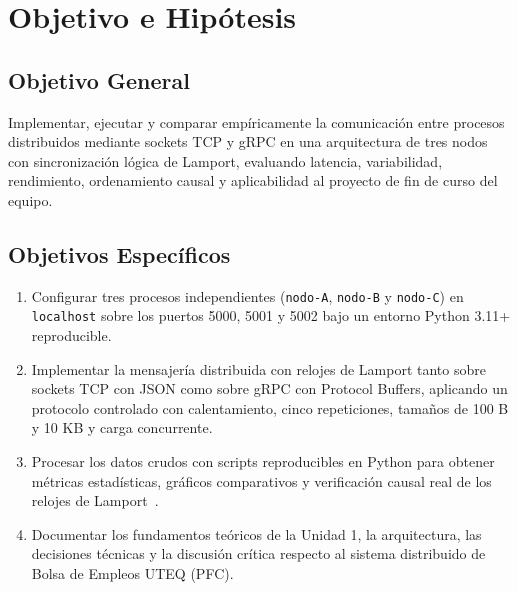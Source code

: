 \documentclass[12pt,a4paper]{article}
\begin{document}
\section{Objetivo e Hipótesis}

\subsection{Objetivo General}
Implementar, ejecutar y comparar empíricamente la comunicación entre procesos distribuidos mediante sockets TCP y gRPC en una arquitectura de tres nodos con sincronización lógica de Lamport, evaluando latencia, variabilidad, rendimiento, ordenamiento causal y aplicabilidad al proyecto de fin de curso del equipo.

\subsection{Objetivos Específicos}
\begin{enumerate}
  \item Configurar tres procesos independientes (\texttt{nodo-A}, \texttt{nodo-B} y \texttt{nodo-C}) en \texttt{localhost} sobre los puertos 5000, 5001 y 5002 bajo un entorno Python 3.11+ reproducible.
  \item Implementar la mensajería distribuida con relojes de Lamport tanto sobre sockets TCP con JSON como sobre gRPC con Protocol Buffers, aplicando un protocolo controlado con calentamiento, cinco repeticiones, tamaños de 100 B y 10 KB y carga concurrente.
  \item Procesar los datos crudos con scripts reproducibles en Python para obtener métricas estadísticas, gráficos comparativos y verificación causal real de los relojes de Lamport~\cite{castello2024inductive}.
  \item Documentar los fundamentos teóricos de la Unidad 1, la arquitectura, las decisiones técnicas y la discusión crítica respecto al sistema distribuido de Bolsa de Empleos UTEQ (PFC).
\end{enumerate}
\end{document}
